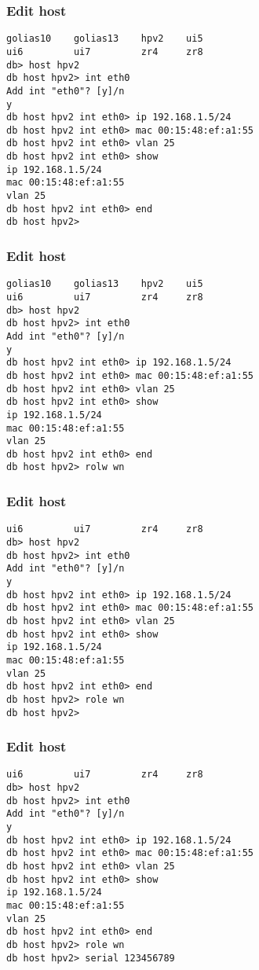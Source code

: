 \documentclass{beamer}
\begin{document}
\begin{frame}[fragile]
\frametitle{Edit host}
\begin{lstlisting}
golias10    golias13    hpv2    ui5
ui6         ui7         zr4     zr8
db> host hpv2
db host hpv2> int eth0
Add int "eth0"? [y]/n
y
db host hpv2 int eth0> ip 192.168.1.5/24
db host hpv2 int eth0> mac 00:15:48:ef:a1:55
db host hpv2 int eth0> vlan 25
db host hpv2 int eth0> show
ip 192.168.1.5/24
mac 00:15:48:ef:a1:55
vlan 25
db host hpv2 int eth0> end
db host hpv2>
\end{lstlisting}
\end{frame}

\begin{frame}[fragile]
\frametitle{Edit host}
\begin{lstlisting}
golias10    golias13    hpv2    ui5
ui6         ui7         zr4     zr8
db> host hpv2
db host hpv2> int eth0
Add int "eth0"? [y]/n
y
db host hpv2 int eth0> ip 192.168.1.5/24
db host hpv2 int eth0> mac 00:15:48:ef:a1:55
db host hpv2 int eth0> vlan 25
db host hpv2 int eth0> show
ip 192.168.1.5/24
mac 00:15:48:ef:a1:55
vlan 25
db host hpv2 int eth0> end
db host hpv2> rolw wn
\end{lstlisting}
\end{frame}

\begin{frame}[fragile]
\frametitle{Edit host}
\begin{lstlisting}
ui6         ui7         zr4     zr8
db> host hpv2
db host hpv2> int eth0
Add int "eth0"? [y]/n
y
db host hpv2 int eth0> ip 192.168.1.5/24
db host hpv2 int eth0> mac 00:15:48:ef:a1:55
db host hpv2 int eth0> vlan 25
db host hpv2 int eth0> show
ip 192.168.1.5/24
mac 00:15:48:ef:a1:55
vlan 25
db host hpv2 int eth0> end
db host hpv2> role wn
db host hpv2>
\end{lstlisting}
\end{frame}

\begin{frame}[fragile]
\frametitle{Edit host}
\begin{lstlisting}
ui6         ui7         zr4     zr8
db> host hpv2
db host hpv2> int eth0
Add int "eth0"? [y]/n
y
db host hpv2 int eth0> ip 192.168.1.5/24
db host hpv2 int eth0> mac 00:15:48:ef:a1:55
db host hpv2 int eth0> vlan 25
db host hpv2 int eth0> show
ip 192.168.1.5/24
mac 00:15:48:ef:a1:55
vlan 25
db host hpv2 int eth0> end
db host hpv2> role wn
db host hpv2> serial 123456789
\end{lstlisting}
\end{frame}
\end{document}
